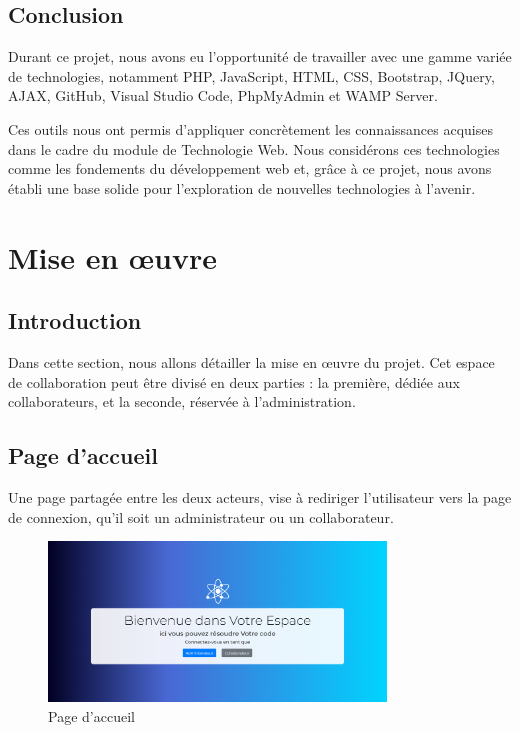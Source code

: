 \documentclass{article}
\begin{document}
        \subsection{Conclusion}
                Durant ce projet, nous avons eu l'opportunité de travailler avec une gamme variée de technologies, notamment PHP, JavaScript, HTML, CSS, Bootstrap, JQuery, AJAX, GitHub, Visual Studio Code, PhpMyAdmin et WAMP Server. 
    
                Ces outils nous ont permis d'appliquer concrètement les connaissances acquises dans le cadre du module de Technologie Web. Nous considérons ces technologies comme les fondements du développement web et, grâce à ce projet, nous avons établi une base solide pour l'exploration de nouvelles technologies à l'avenir.
    
    \section{Mise en œuvre}
        \subsection{Introduction}
            Dans cette section, nous allons détailler la mise en œuvre du projet. Cet espace de collaboration peut être divisé en deux parties : la première, dédiée aux collaborateurs, et la seconde, réservée à l'administration.
        \subsection{Page d'accueil}
            Une page partagée entre les deux acteurs, vise à rediriger l'utilisateur vers la page de connexion, qu'il soit un administrateur ou un collaborateur.
            \begin{figure}[h!]
                \centering
                \includegraphics[width=0.8\textwidth]{assets/webSite/homePage.png}
                \caption{Page d'accueil}
            \end{figure}
            \FloatBarrier
\end{document}
